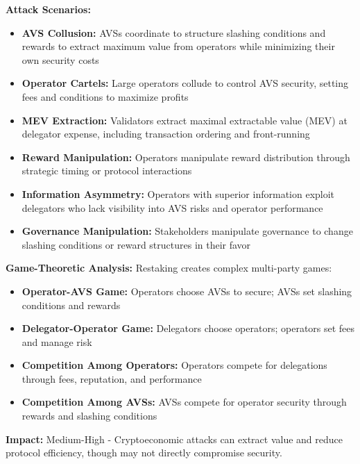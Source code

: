 \documentclass[runningheads]{llncs}
\begin{document}
\textbf{Attack Scenarios:}
\begin{itemize}
    \item \textbf{AVS Collusion:} AVSs coordinate to structure slashing conditions and rewards to extract maximum value from operators while minimizing their own security costs
    \item \textbf{Operator Cartels:} Large operators collude to control AVS security, setting fees and conditions to maximize profits
    \item \textbf{MEV Extraction:} Validators extract maximal extractable value (MEV) at delegator expense, including transaction ordering and front-running
    \item \textbf{Reward Manipulation:} Operators manipulate reward distribution through strategic timing or protocol interactions
    \item \textbf{Information Asymmetry:} Operators with superior information exploit delegators who lack visibility into AVS risks and operator performance
    \item \textbf{Governance Manipulation:} Stakeholders manipulate governance to change slashing conditions or reward structures in their favor
\end{itemize}

\textbf{Game-Theoretic Analysis:}
Restaking creates complex multi-party games:
\begin{itemize}
    \item \textbf{Operator-AVS Game:} Operators choose AVSs to secure; AVSs set slashing conditions and rewards
    \item \textbf{Delegator-Operator Game:} Delegators choose operators; operators set fees and manage risk
    \item \textbf{Competition Among Operators:} Operators compete for delegations through fees, reputation, and performance
    \item \textbf{Competition Among AVSs:} AVSs compete for operator security through rewards and slashing conditions
\end{itemize}

\textbf{Impact:} Medium-High - Cryptoeconomic attacks can extract value and reduce protocol efficiency, though may not directly compromise security.
\end{document}
